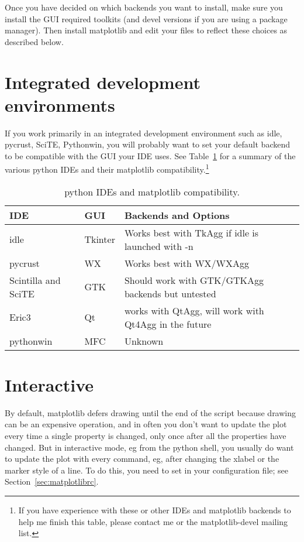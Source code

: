\documentclass[twoside]{book}
\begin{document}
Once you have decided on which backends you want to install, make sure
you install the GUI required toolkits (and devel versions if you are
using a package manager).  Then install matplotlib and edit your
 files to reflect these choices as described
below.

\section{Integrated development environments}
\label{sec:ides}

If you work primarily in an integrated development environment such as
idle, pycrust, SciTE, Pythonwin, you will probably want to set your
default backend to be compatible with the GUI your IDE uses. See
Table~\ref{tab:ides} for a summary of the various python IDEs and
their matplotlib compatibility.\footnote{If you have experience with
  these or other IDEs and matplotlib backends to help me finish this
  table, please contact me or the matplotlib-devel mailing list.}

\begin{table}[htbp]
  \centering
  \begin{tabular}[t]{|l|l|l|}\hline
  IDE & GUI & Backends and Options\\\hline
  idle & Tkinter & Works best with TkAgg if idle is launched with -n\\
  pycrust & WX & Works best with WX/WXAgg\\
  Scintilla and SciTE & GTK & Should work with GTK/GTKAgg backends but untested\\
  Eric3 & Qt & works with QtAgg, will work with Qt4Agg in the future\\
  pythonwin & MFC & Unknown\\\hline

  \end{tabular}
  \caption{\label{tab:ides}python IDEs and matplotlib compatibility.
  }
\end{table}

\section{Interactive}
\label{sec:interactive}

By default, matplotlib defers drawing until the end of the script
because drawing can be an expensive operation, and in often you don't
want to update the plot every time a single property is changed, only
once after all the properties have changed.  But in interactive mode,
eg from the python shell, you usually do want to update the plot with
every command, eg, after changing the xlabel or the marker style of a
line.  To do this, you need to set  in your
configuration file; see Section~\ref{sec:matplotlibrc}.
\end{document}
